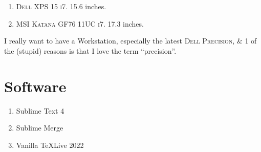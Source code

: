 \documentclass[oneside]{book}
\numberwithin{equation}{section}
\begin{document}
\begin{enumerate}
	\item \textsc{Dell XPS 15 i7.} 15.6 inches.
	\item \textsc{MSI Katana GF76 11UC i7.} 17.3 inches.
\end{enumerate}
I really want to have a Workstation, especially the latest \textsc{Dell Precision}, \& 1 of the (stupid) reasons is that I love the term ``precision''.

\section{Software}

\begin{enumerate}
	\item Sublime Text 4
	\item Sublime Merge
	\item Vanilla \TeX Live 2022
\end{enumerate}


\printbibliography[heading=bibintoc]
\end{document}
